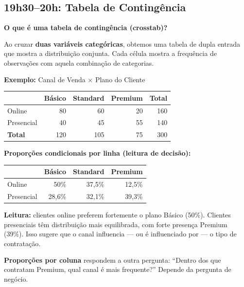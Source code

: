 \subsection{19h30–20h: Tabela de Contingência}

\begin{SolvedBox}
\textbf{O que é uma tabela de contingência (crosstab)?}

Ao cruzar \textbf{duas variáveis categóricas}, obtemos uma tabela de
dupla entrada que mostra a distribuição conjunta. Cada célula mostra
a frequência de observações com aquela combinação de categorias.

\textbf{Exemplo:} Canal de Venda × Plano do Cliente

\begin{center}
\begin{tabular}{|l|r|r|r|r|}
\hline
& \textbf{Básico} & \textbf{Standard} & \textbf{Premium} & \textbf{Total} \\
\hline
Online & 80 & 60 & 20 & 160 \\
Presencial & 40 & 45 & 55 & 140 \\
\hline
\textbf{Total} & 120 & 105 & 75 & 300 \\
\hline
\end{tabular}
\end{center}

\textbf{Proporções condicionais por linha (leitura de decisão):}
\begin{center}
\begin{tabular}{|l|r|r|r|}
\hline
& \textbf{Básico} & \textbf{Standard} & \textbf{Premium} \\
\hline
Online & 50\% & 37,5\% & 12,5\% \\
Presencial & 28,6\% & 32,1\% & 39,3\% \\
\hline
\end{tabular}
\end{center}

\textbf{Leitura:} clientes online preferem fortemente o plano Básico (50\%).
Clientes presenciais têm distribuição mais equilibrada, com forte presença
Premium (39\%). Isso sugere que o canal influencia — ou é influenciado por —
o tipo de contratação.

\textbf{Proporções por coluna} respondem a outra pergunta: ``Dentro dos que
contratam Premium, qual canal é mais frequente?'' Depende da pergunta de negócio.
\end{SolvedBox}

